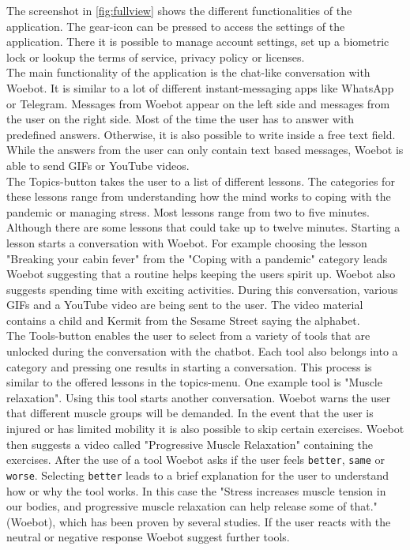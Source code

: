 The screenshot in \autoref{fig:fullview} shows the different functionalities of the application.
The gear-icon can be pressed to access the settings of the application.
There it is possible to manage account settings, set up a biometric lock or lookup the terms of service, privacy policy or licenses.\\

The main functionality of the application is the chat-like conversation with Woebot.
It is similar to a lot of different instant-messaging apps like WhatsApp or Telegram\cite{whatsapp, telegram}.
Messages from Woebot appear on the left side and messages from the user on the right side.
Most of the time the user has to answer with predefined answers.
Otherwise, it is also possible to write inside a free text field.
While the answers from the user can only contain text based messages, Woebot is able to send GIFs or YouTube videos\cite{youtube}.\\

The Topics-button takes the user to a list of different lessons.
The categories for these lessons range from understanding how the mind works to coping with the pandemic or managing stress.
Most lessons range from two to five minutes.
Although there are some lessons that could take up to twelve minutes.
Starting a lesson starts a conversation with Woebot.
For example choosing the lesson "Breaking your cabin fever" from the "Coping with a pandemic" category leads Woebot suggesting that a routine helps keeping the users spirit up.
Woebot also suggests spending time with exciting activities.
During this conversation, various GIFs and a YouTube video are being sent to the user.
The video material contains a child and Kermit from the Sesame Street saying the alphabet. \\

The Tools-button enables the user to select from a variety of tools that are unlocked during the conversation with the chatbot.
Each tool also belongs into a category and pressing one results in starting a conversation.
This process is similar to the offered lessons in the topics-menu. One example tool is "Muscle relaxation".
Using this tool starts another conversation. Woebot warns the user that different muscle groups will be demanded.
In the event that the user is injured or has limited mobility it is also possible to skip certain exercises.
Woebot then suggests a video called "Progressive Muscle Relaxation" containing the exercises.
After the use of a tool Woebot asks if the user feels \texttt{better}, \texttt{same} or \texttt{worse}.
Selecting \texttt{better} leads to a brief explanation for the user to understand how or why the tool works.
In this case the "Stress increases muscle tension in our bodies, and progressive muscle relaxation can help release some of that." (Woebot), which has been proven by several studies\cite{progressive-muscle, stress-pmr}.
If the user reacts with the neutral or negative response Woebot suggest further tools.\\

